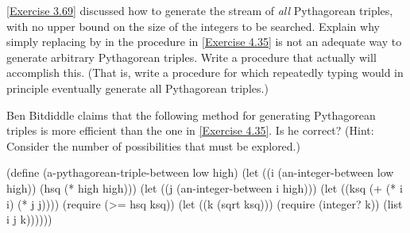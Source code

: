 \begin{exercise}
	\label{Exercise 4.36}
	\cref{Exercise 3.69} discussed how to generate the stream of \emph{all} Pythagorean triples, with no upper bound on the size of the integers to be searched.
	Explain why simply replacing  by  in the procedure in \cref{Exercise 4.35} is not an adequate way to generate arbitrary Pythagorean triples.
	Write a procedure that actually will accomplish this.
	(That is, write a procedure for which repeatedly typing  would in principle eventually generate all Pythagorean triples.)
\end{exercise}



\begin{exercise}
	\label{Exercise 4.37}
	Ben Bitdiddle claims that the following method for generating Pythagorean triples is more efficient than the one in \cref{Exercise 4.35}.
	Is he correct?
	(Hint:
	Consider the number of possibilities that must be explored.)
	\begin{scheme}
	  (define (a-pythagorean-triple-between low high)
	    (let ((i (an-integer-between low high))
	          (hsq (* high high)))
	      (let ((j (an-integer-between i high)))
	        (let ((ksq (+ (* i i) (* j j))))
	          (require (>= hsq ksq))
	          (let ((k (sqrt ksq)))
	            (require (integer? k))
	            (list i j k))))))
	\end{scheme}
\end{exercise}
